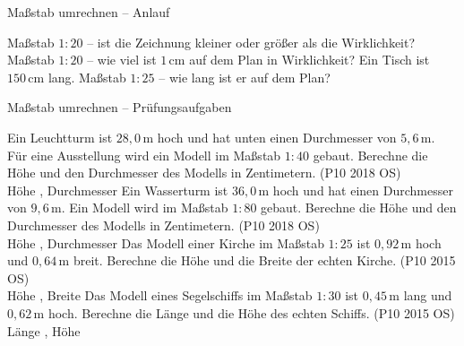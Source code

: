 \setcounter{aufgabe}{57}

\begin{aufgabe}{Maßstab umrechnen – Anlauf}
\begin{teile}
\teil Maßstab $1 : 20$ – ist die Zeichnung kleiner oder größer als die Wirklichkeit?  \\ 
\teil Maßstab $1 : 20$ – wie viel ist $1\,\text{cm}$ auf dem Plan in Wirklichkeit? \leerfeld[cm]
\teil Ein Tisch ist $150\,\text{cm}$ lang. Maßstab $1 : 25$ – wie lang ist er auf dem Plan? \leerfeld[cm]
\end{teile}
\end{aufgabe}

\begin{aufgabe}{Maßstab umrechnen – Prüfungsaufgaben}
\begin{teile}
\teil Ein Leuchtturm ist $28{,}0\,\text{m}$ hoch und hat unten einen Durchmesser von $5{,}6\,\text{m}$. Für eine Ausstellung wird ein Modell im Maßstab $1 : 40$ gebaut. Berechne die Höhe und den Durchmesser des Modells in Zentimetern. \hfill (P10 2018 OS) \\ Höhe \leerfeld[cm] , Durchmesser \leerfeld[cm]
\teil Ein Wasserturm ist $36{,}0\,\text{m}$ hoch und hat einen Durchmesser von $9{,}6\,\text{m}$. Ein Modell wird im Maßstab $1 : 80$ gebaut. Berechne die Höhe und den Durchmesser des Modells in Zentimetern. \hfill (P10 2018 OS) \\ Höhe \leerfeld[cm] , Durchmesser \leerfeld[cm]
\teil Das Modell einer Kirche im Maßstab $1 : 25$ ist $0{,}92\,\text{m}$ hoch und $0{,}64\,\text{m}$ breit. Berechne die Höhe und die Breite der echten Kirche. \hfill (P10 2015 OS) \\ Höhe \leerfeld[m] , Breite \leerfeld[m]
\teil Das Modell eines Segelschiffs im Maßstab $1 : 30$ ist $0{,}45\,\text{m}$ lang und $0{,}62\,\text{m}$ hoch. Berechne die Länge und die Höhe des echten Schiffs. \hfill (P10 2015 OS) \\ Länge \leerfeld[m] , Höhe \leerfeld[m]
\end{teile}
\end{aufgabe}

